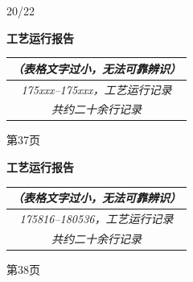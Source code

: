 \documentclass[UTF8,10pt,a4paper,fontset=fandol]{ctexart}
\newcommand{\handwritten}[1]{#1}
\begin{document}
\vfill

\handwritten{20/22}

\newpage

\noindent
\begin{minipage}[t]{0.48\textwidth}
\centering
\textbf{工艺运行报告}

\vspace{0.3em}
\begin{tabularx}{\linewidth}{|c|X|}
\hline
\multicolumn{2}{|c|}{\textit{（表格文字过小，无法可靠辨识）}}\\
\hline
\multicolumn{2}{|c|}{\textit{175xxx--175xxx，工艺运行记录}}\\
\hline
\multicolumn{2}{|c|}{\textit{共约二十余行记录}}\\
\hline
\end{tabularx}

\vfill
\scriptsize 第37页
\end{minipage}
\hfill
\begin{minipage}[t]{0.48\textwidth}
\centering
\textbf{工艺运行报告}

\vspace{0.3em}
\begin{tabularx}{\linewidth}{|c|X|}
\hline
\multicolumn{2}{|c|}{\textit{（表格文字过小，无法可靠辨识）}}\\
\hline
\multicolumn{2}{|c|}{\textit{175816--180536，工艺运行记录}}\\
\hline
\multicolumn{2}{|c|}{\textit{共约二十余行记录}}\\
\hline
\end{tabularx}

\vfill
\scriptsize 第38页
\end{minipage}

\vspace{2em}
\end{document}
